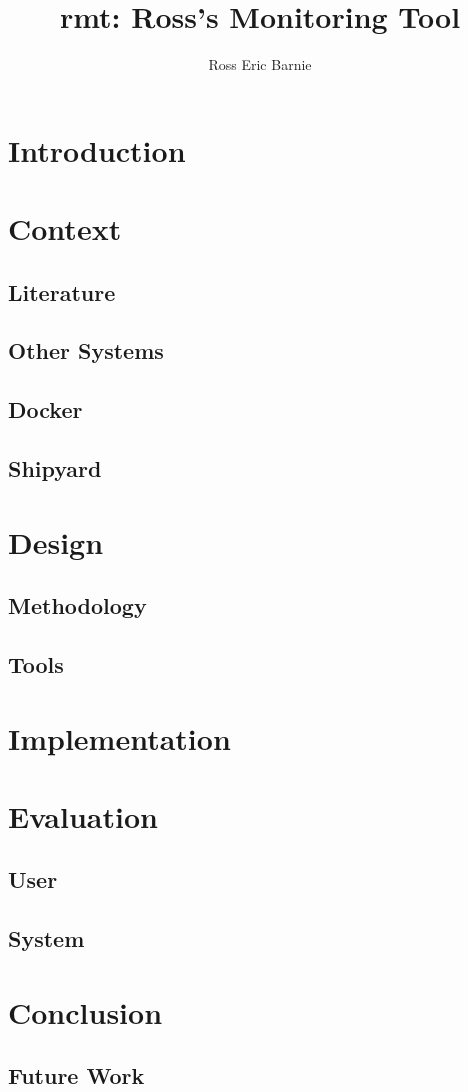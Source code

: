 \documentclass{l4proj}
\title{rmt: Ross's Monitoring Tool}
\author{Ross Eric Barnie}
\begin{document}
\maketitle
\tableofcontents



\chapter{Introduction}


\chapter{Context}
\section{Literature}
\section{Other Systems}
\section{Docker}
\section{Shipyard}

\chapter{Design}
\section{Methodology}

\section{Tools}


\chapter{Implementation}

\chapter{Evaluation}
\section{User}
\section{System}

\chapter{Conclusion}
\section{Future Work}
\section{}


\end{document}

